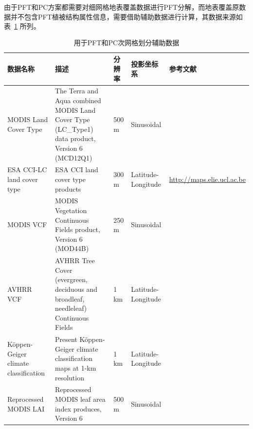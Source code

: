 由于PFT和PC方案都需要对细网格地表覆盖数据进行PFT分解，而地表覆盖原数据并不包含PFT植被结构属性信息，需要借助辅助数据进行计算，其数据来源如表~\ref{tab:网格划分辅助数据} 所列。

\begin{landscape}
  \begin{table}[htbp]
    \centering
    \caption{用于PFT和PC次网格划分辅助数据}
    \label{tab:网格划分辅助数据}

    \begin{tabular}[h]{p{3cm}p{6cm}p{2cm}p{2cm}p{5cm}}
      \toprule
      数据名称                             & 描述                                                                                            & 分辨率 & 投影坐标系         & 参考文献                                                    \\ \midrule
      MODIS Land Cover Type                & The Terra and Aqua combined MODIS Land Cover Type (LC\_Type1) data product, Version 6 (MCD12Q1) & 500 m  & Sinusoidal         & \citet{Friedl2019}                                          \\ \midrule
      ESA CCI-LC land cover type           & ESA CCI land cover type products                                                                & 300 m  & Latitude-Longitude & \url{http://maps.elie.ucl.ac.be}                            \\ \midrule
      MODIS VCF                            & MODIS Vegetation Continuous Fields product, Version 6 (MOD44B)                                  & 250 m  & Sinusoidal         & \citet{DiMiceli2015}                                        \\ \midrule
      AVHRR VCF                            & AVHRR Tree Cover (evergreen, deciduous and broadleaf, needleleaf) Continuous Fields             & 1 km   & Latitude-Longitude & \citet{defries2000new}                                      \\ \midrule
      Köppen-Geiger climate classification & Present Köppen-Geiger climate classification maps at 1-km resolution                            & 1 km   & Latitude-Longitude & \citet{beck2018}                                            \\ \midrule
      Reprocessed MODIS LAI                & Reprocessed MODIS leaf area index produces, Version 6                                           & 500 m  & Sinusoidal         & \citet{yuan2011reprocessing,lin2023ReprocessedMODISVersion} \\ \midrule

\end{tabular}
\end{table}
\end{landscape}
